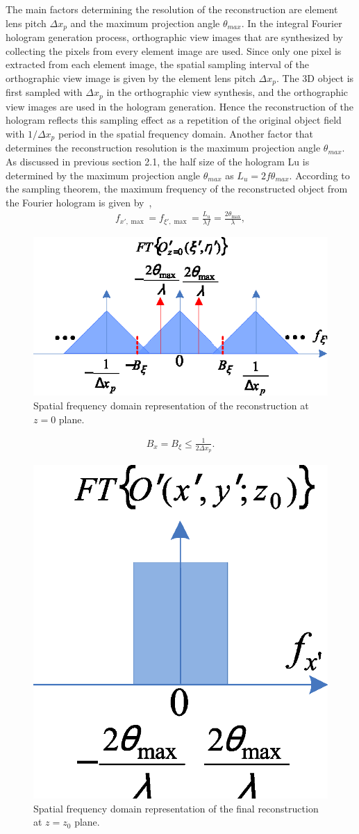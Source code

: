 \documentclass[10pt,letterpaper]{article}
\begin{document}
The main factors determining the resolution of the reconstruction are element lens pitch $\Delta x_p$ and the maximum projection angle $\theta_{max}$. In the integral Fourier hologram generation process, orthographic view images that are synthesized by collecting the pixels from every element image are used. Since only one pixel is extracted from each element image, the spatial sampling interval of the orthographic view image is given by the element lens pitch $\Delta x_p$. The 3D object is first sampled with $\Delta x_p$ in the orthographic view synthesis, and the orthographic view images are used in the hologram generation. Hence the reconstruction of the hologram reflects this sampling effect as a repetition of the original object field with $1/\Delta x_p$ period in the spatial frequency domain. Another factor that determines the reconstruction resolution is the maximum projection angle $\theta_{max}$. As discussed in previous section 2.1, the half size of the hologram Lu is determined by the maximum projection angle $\theta_{max}$ as $L_u=2 f\theta_{max}$. According to the sampling theorem, the maximum frequency of the reconstructed object from the Fourier hologram is given by~\cite{Goodman},
\begin{equation}
\begin{aligned}
{f_{x',\max }} = {f_{\xi ',\max }} = \frac{{{L_u}}}{{\lambda f}} = \frac{{2{\theta _{\max }}}}{\lambda },
\end{aligned}
\label{eq_7}
\end{equation}

\begin{figure}[htbp]
\centering\includegraphics[width=.4\columnwidth]{fig_7}
\caption{Spatial frequency domain representation of the reconstruction at $z=0$ plane.}
\label{fig_7}
\end{figure}

\begin{equation}
\begin{aligned}
{B_x} = {B_\xi } \leqslant \frac{1}{{2\Delta {x_p}}}.
\end{aligned}
\label{eq_8}
\end{equation}

\begin{figure}[htb]
\centering\includegraphics[width=.2\columnwidth]{fig_8}
\caption{Spatial frequency domain representation of the final reconstruction at $z=z_0$ plane.}
\label{fig_8}
\end{figure}
\end{document}
